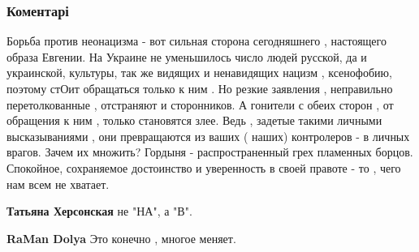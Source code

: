  
 
 
 
 
\subsubsection{Коментарі}

\begin{itemize} %
 

Борьба против неонацизма - вот сильная сторона сегодняшнего , настоящего образа
Евгении. На Украине не уменьшилось число людей русской, да и украинской,
культуры, так же видящих и ненавидящих нацизм , ксенофобию, поэтому стОит
обращаться только к ним . Но резкие заявления , неправильно перетолкованные ,
отстраняют и сторонников. А гонители с обеих сторон , от обращения к ним ,
только становятся злее. Ведь , задетые такими личными высказываниями , они
превращаются из ваших ( наших) контролеров - в личных врагов. Зачем их множить?
Гордыня - распространенный грех пламенных борцов. Спокойное, сохраняемое
достоинство и уверенность в своей правоте - то , чего нам всем не хватает.

\begin{itemize} %
 
\textbf{Татьяна Херсонская} не "НА", а "В".

 
\textbf{RaMan Dolya} Это конечно , многое меняет.


\end{itemize}
\end{itemize}
